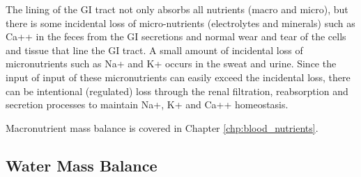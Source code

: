 The lining of the GI tract not only absorbs all nutrients (macro and micro), but there is some incidental loss of micro-nutrients (electrolytes and minerals) such as Ca++ in the feces from the GI secretions and normal wear and tear of the cells and tissue that line the GI tract. A small amount of incidental loss of micronutrients such as Na+ and K+ occurs in the sweat and urine. Since the input of input of these micronutrients can easily exceed the incidental loss, there can be intentional (regulated) loss through the renal filtration, reabsorption and secretion processes to maintain Na+, K+ and Ca++ homeostasis.

Macronutrient mass balance is covered in Chapter \ref{chp:blood_nutrients}.

\subsection{Water Mass Balance}

